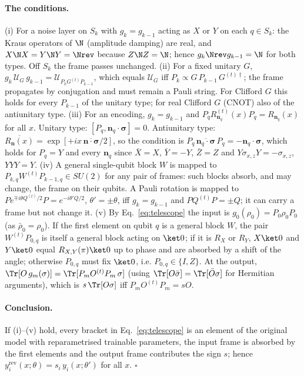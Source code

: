 \paragraph{The conditions.}
(i) For a noise layer on $S_k$ with $g_k=g_{k-1}$ acting as $X$ or $Y$ on each $q\in S_k$: the
Kraus operators of $\N$ (amplitude damping) are real, and $X\N X=Y\N Y=\Nrev$ because
$Z\N Z=\N$; hence $g_k\Nrev g_{k-1}=\N$ for both types. Off $S_k$ the frame passes unchanged.
(ii) For a fixed unitary $G$, $g_k\,\mathcal U_G\,g_{k-1}=\mathcal U_{P_kG^{(t)}P_{k-1}}$, which
equals $\mathcal U_G$ iff $P_k\propto G\,P_{k-1}\,G^{(t)\dagger}$; the frame propagates by
conjugation and must remain a Pauli string. For Clifford $G$ this holds for every
$P_{k-1}$ of the unitary type; for real Clifford $G$ (CNOT) also of the antiunitary type.
(iii) For an encoding, $g_k=g_{k-1}$ and $P_q R^{(t)}_{\mathbf n_q}(x)P_q=R_{\mathbf n_q}(x)$ for
all $x$. Unitary type: $[P_q,\mathbf n_q\cdot\boldsymbol\sigma]=0$. Antiunitary type:
$\overline{R_{\mathbf n}(x)}=\exp[+ix\,\overline{\mathbf n\cdot\boldsymbol\sigma}/2]$, so the
condition is $P_q\,\overline{\mathbf n_q\cdot\boldsymbol\sigma}\,P_q=-\mathbf n_q\cdot\boldsymbol\sigma$,
which holds for $P_q=Y$ and every $\mathbf n_q$ since $\bar X=X$, $\bar Y=-Y$, $\bar Z=Z$ and
$Y\sigma_{x,z}Y=-\sigma_{x,z}$, $YYY=Y$.
(iv) A general single-qubit block $W$ is mapped to $P_{k,q}W^{(t)}P_{k-1,q}\in SU(2)$ for any
pair of frames: such blocks absorb, and may change, the frame on their qubits. A Pauli
rotation is mapped to $P e^{\mp i\theta Q^{(t)}/2}P=e^{-i\theta' Q/2}$, $\theta'=\pm\theta$,
iff $g_k=g_{k-1}$ and $PQ^{(t)}P=\pm Q$; it can carry a frame but not change it.
(v) By Eq.~\eqref{eq:telescope} the input is $g_0(\rho_0)=P_0\rho_0P_0$ (as $\bar\rho_0=\rho_0$).
If the first element on qubit $q$ is a general block $W$, the pair $W^{(t)}P_{0,q}$ is itself
a general block acting on $\ket 0$; if it is $R_X$ or $R_Y$, $X\ket0$ and $Y\ket0$ equal
$R_{X,Y}(\pi)\ket0$ up to phase and are absorbed by a shift of the angle; otherwise $P_{0,q}$
must fix $\ket0$, i.e. $P_{0,q}\in\{I,Z\}$. At the output,
$\Tr[O\,g_m(\sigma)]=\Tr[P_mO^{(t)}P_m\,\sigma]$ (using $\Tr[O\bar\sigma]=\Tr[\bar O\sigma]$
for Hermitian arguments), which is $s\,\Tr[O\sigma]$ iff $P_mO^{(t)}P_m=sO$.

\paragraph{Conclusion.}
If (i)--(v) hold, every bracket in Eq.~\eqref{eq:telescope} is an element of the original
model with reparametrised trainable parameters, the input frame is absorbed by the first
elements and the output frame contributes the sign $s$; hence
$y^{\mathrm{rev}}_i(x;\theta)=s_i\,y_i(x;\theta')$ for all $x$. \hfill$\square$

